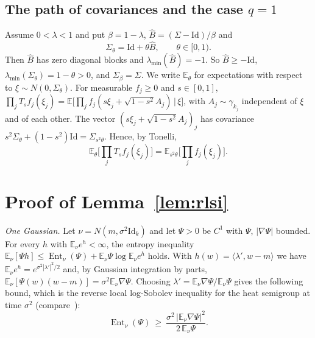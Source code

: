 \documentclass[11pt]{amsart}
\theoremstyle{definition}
\newcommand{\E}{\mathbb{E}}
\newcommand{\Ent}{\operatorname{Ent}}
\newcommand{\Id}{\mathrm{Id}}
\begin{document}
\subsection{The path of covariances and the case \texorpdfstring{$q=1$}{q=1}}
Assume $0<\lambda<1$ and put $\beta=1-\lambda$, $\widehat B=(\Sigma-\Id)/\beta$ and
\[
\Sigma_\theta=\Id+\theta\widehat B,\qquad\theta\in[0,1).
\]
Then $\widehat B$ has zero diagonal blocks and $\lambda_{\min}(\widehat B)=-1$. So $\widehat B\ge-\Id$,
$\lambda_{\min}(\Sigma_\theta)=1-\theta>0$, and $\Sigma_\beta=\Sigma$. We write $\E_\theta$ for expectations with
respect to $\xi\sim N(0,\Sigma_\theta)$. For measurable $f_j\ge0$ and $s\in[0,1]$,
$\prod_jT_sf_j(\xi_j)=\E\big[\prod_jf_j(s\xi_j+\sqrt{1-s^2}A_j)\,\big|\,\xi\big]$, with $A_j\sim\gamma_{k_j}$ independent
of $\xi$ and of each other. The vector $(s\xi_j+\sqrt{1-s^2}A_j)_j$ has covariance
$s^2\Sigma_\theta+(1-s^2)\Id=\Sigma_{s^2\theta}$. Hence, by Tonelli,
\begin{equation}\label{eq:q1}
\E_\theta\Big[\prod_jT_sf_j(\xi_j)\Big]=\E_{s^2\theta}\Big[\prod_jf_j(\xi_j)\Big].
\end{equation}

\section{Proof of Lemma~\ref{lem:rlsi}}
\emph{One Gaussian.} Let $\nu=N(m,\sigma^2\Id_k)$ and let $\Psi>0$ be $C^1$ with $\Psi$, $|\nabla\Psi|$ bounded. For
every $h$ with $\E_\nu e^h<\infty$, the entropy inequality $\E_\nu[\Psi h]\le\Ent_\nu(\Psi)+\E_\nu\Psi\log\E_\nu e^h$
holds. With $h(w)=\langle\lambda',w-m\rangle$ we have $\E_\nu e^h=e^{\sigma^2|\lambda'|^2/2}$ and, by Gaussian
integration by parts, $\E_\nu[\Psi(w)(w-m)]=\sigma^2\E_\nu\nabla\Psi$. Choosing $\lambda'=\E_\nu\nabla\Psi/\E_\nu\Psi$
gives the following bound, which is the reverse local log-Sobolev inequality for the heat semigroup at time
$\sigma^2$ (compare~\cite[Ch.~5]{BGL14}):
\begin{equation}\label{eq:onegauss}
\Ent_\nu(\Psi)\ \ge\ \frac{\sigma^2\,|\E_\nu\nabla\Psi|^2}{2\,\E_\nu\Psi}.
\end{equation}
\end{document}
